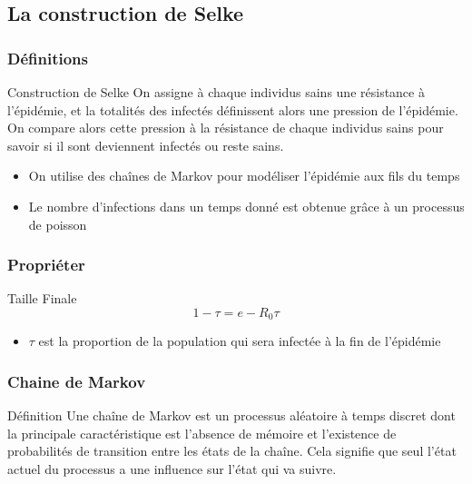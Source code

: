 \subsection{La construction de Selke}

\begin{frame}
    \frametitle{Définitions}

    \begin{block}{Construction de Selke}
        On assigne à chaque individus sains une résistance à l'épidémie, et la totalités des infectés définissent alors une pression de l'épidémie. On compare alors cette pression à la résistance de chaque individus sains pour savoir si il sont deviennent infectés ou reste sains.
    \end{block}

    \begin{itemize}
        \item On utilise des chaînes de Markov pour modéliser l'épidémie aux fils du temps
        \item Le nombre d'infections dans un temps donné est obtenue grâce à un processus de poisson
    \end{itemize}
\end{frame}

\begin{frame}
    \frametitle{Propriéter}

    \begin{block}{Taille Finale}
        $$ 1 - \tau = e - R_0\tau $$
    \end{block}

    \begin{itemize}
        \item $\tau$ est la proportion de la population qui sera infectée à la fin de l’épidémie
    \end{itemize}
\end{frame}


\begin{frame}
    \frametitle{Chaine de Markov}

    \begin{block}{Définition}
        Une chaîne de Markov est un processus aléatoire à temps discret dont la principale caractéristique est l’absence de mémoire et l’existence de probabilités de transition entre les états de la chaîne. Cela signifie que seul l’état actuel du processus a une influence sur l’état qui va suivre.
    \end{block}


\end{frame}

